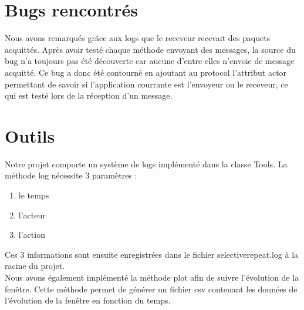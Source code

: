\documentclass{article}
\begin{document}
\section{Bugs rencontrés}

Nous avons remarqués grâce aux logs que le receveur recevait des paquets acquittés. 
Après avoir testé chaque méthode envoyant des messages, la source du bug n'a toujours pas été découverte car aucune d'entre elles n'envoie de message acquitté. 
Ce bug a donc été contourné en ajoutant au protocol l'attribut actor permettant de savoir si l'application courrante est l'envoyeur ou le receveur, ce qui est testé lors de la réception d'un message.

\section{Outils}

Notre projet comporte un système de logs implémenté dans la classe Tools.
La méthode log nécessite 3 paramètres : 
\begin{enumerate}
\item le temps
\item l'acteur
\item l'action
\end{enumerate}
Ces 3 informations sont ensuite enregistrées dans le fichier selectiverepeat.log à la racine du projet.\\
Nous avons également implémenté la méthode plot afin de suivre l'évolution de la fenêtre.
Cette méthode permet de générer un fichier csv contenant les données de l'évolution de la fenêtre en fonction du temps. 
\end{document}
